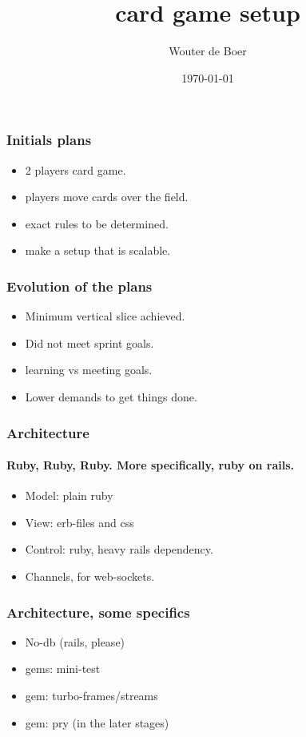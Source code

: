 \documentclass[17pt]{beamer}
\begin{document}
	\author{Wouter de Boer}
	\title{card game setup}
	\date{\today}
	\subject{Individual project}
	\begin{frame}[plain]
		\maketitle
	\end{frame}
	
	\begin{frame}
		\frametitle{Initials plans}

		\begin{itemize}
			\item 2 players card game.
			\item players move cards over the field.
			\item exact rules to be determined.
				\item make a setup that is scalable.
		\end{itemize}
	\end{frame}

	\begin{frame}
		\frametitle{Evolution of the plans}
	\begin{itemize}
		\item  Minimum vertical slice achieved.
		\item  Did not meet sprint goals.
		\item learning vs meeting goals.
		\item Lower demands to get things done.
	\end{itemize}
	\end{frame}
	\begin{frame}
		\frametitle{Architecture}
		\framesubtitle{Ruby, Ruby, Ruby. More specifically, ruby on rails.}
		\begin{itemize}
		\item Model: plain ruby
		\item View: erb-files and css
		\item Control: ruby, heavy rails dependency.
		\item Channels, for web-sockets.
		\end{itemize}
	\end{frame}
	\begin{frame}
		\frametitle{Architecture, some specifics}
		\begin{itemize}
			\item No-db (rails, please)
			\item gems: mini-test
			\item gem: turbo-frames/streams
			\item gem: pry (in the later stages)
		\end{itemize}
	\end{frame}
\end{document}
